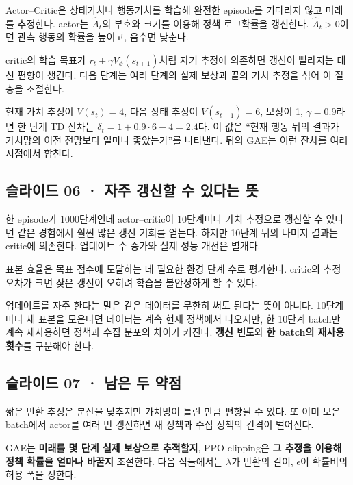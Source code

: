 \documentclass[11pt,a4paper]{article}
\begin{document}
Actor–Critic은 상태가치나 행동가치를 학습해 완전한 episode를 기다리지 않고 미래를 추정한다. actor는 $\widehat A_t$의 부호와 크기를 이용해 정책 로그확률을 갱신한다. $\widehat A_t>0$이면 관측 행동의 확률을 높이고, 음수면 낮춘다.\par

critic의 학습 목표가 $r_t+\gamma V_\phi(s_{t+1})$처럼 자기 추정에 의존하면 갱신이 빨라지는 대신 편향이 생긴다. 다음 단계는 여러 단계의 실제 보상과 끝의 가치 추정을 섞어 이 절충을 조절한다.\par

현재 가치 추정이 $V(s_t)=4$, 다음 상태 추정이 $V(s_{t+1})=6$, 보상이 1, $\gamma=0.9$라면 한 단계 TD 잔차는 $\delta_t=1+0.9\cdot6-4=2.4$다. 이 값은 “현재 행동 뒤의 결과가 가치망의 이전 전망보다 얼마나 좋았는가”를 나타낸다. 뒤의 GAE는 이런 잔차를 여러 시점에서 합친다.\par

\subsection{슬라이드 06 · 자주 갱신할 수 있다는 뜻}

한 episode가 1000단계인데 actor–critic이 10단계마다 가치 추정으로 갱신할 수 있다면 같은 경험에서 훨씬 많은 갱신 기회를 얻는다. 하지만 10단계 뒤의 나머지 결과는 critic에 의존한다. 업데이트 수 증가와 실제 성능 개선은 별개다.\par

표본 효율은 목표 점수에 도달하는 데 필요한 환경 단계 수로 평가한다. critic의 추정 오차가 크면 잦은 갱신이 오히려 학습을 불안정하게 할 수 있다.\par

업데이트를 자주 한다는 말은 같은 데이터를 무한히 써도 된다는 뜻이 아니다. 10단계마다 새 표본을 모은다면 데이터는 계속 현재 정책에서 나오지만, 한 10단계 batch만 계속 재사용하면 정책과 수집 분포의 차이가 커진다. \textbf{갱신 빈도}와 \textbf{한 batch의 재사용 횟수}를 구분해야 한다.\par

\subsection{슬라이드 07 · 남은 두 약점}

짧은 반환 추정은 분산을 낮추지만 가치망이 틀린 만큼 편향될 수 있다. 또 이미 모은 batch에서 actor를 여러 번 갱신하면 새 정책과 수집 정책의 간격이 벌어진다.\par

GAE는 \textbf{미래를 몇 단계 실제 보상으로 추적할지}, PPO clipping은 \textbf{그 추정을 이용해 정책 확률을 얼마나 바꿀지} 조절한다. 다음 식들에서는 $\lambda$가 반환의 길이, $\epsilon$이 확률비의 허용 폭을 정한다.\par
\end{document}
